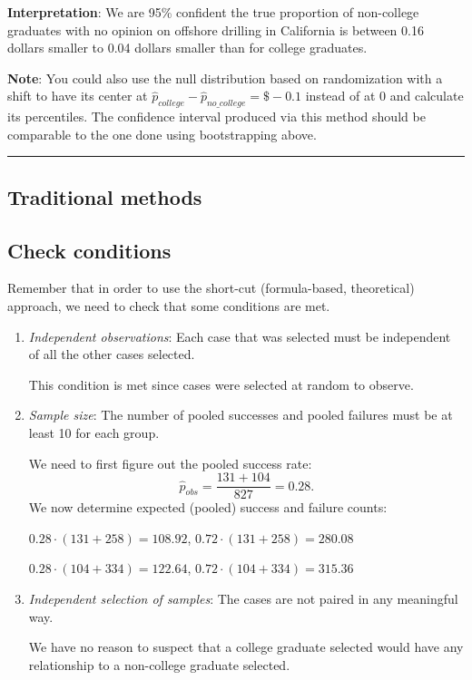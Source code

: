 \documentclass[]{tufte-book}
\let\oldrule=\rule
\renewcommand{\rule}[1]{\oldrule{\linewidth}}
\theoremstyle{definition}
\theoremstyle{definition}
\theoremstyle{remark}
\begin{document}
\textbf{Interpretation}: We are 95\% confident the true proportion of
non-college graduates with no opinion on offshore drilling in California
is between 0.16 dollars smaller to 0.04 dollars smaller than for college
graduates.

\textbf{Note}: You could also use the null distribution based on
randomization with a shift to have its center at
\(\hat{p}_{college} - \hat{p}_{no\_college} = \$-0.1\) instead of at 0
and calculate its percentiles. The confidence interval produced via this
method should be comparable to the one done using bootstrapping above.

\begin{center}\rule{0.5\linewidth}{\linethickness}\end{center}

\subsection{Traditional methods}\label{traditional-methods-2}

\subsection{Check conditions}\label{check-conditions-2}

Remember that in order to use the short-cut (formula-based, theoretical)
approach, we need to check that some conditions are met.

\begin{enumerate}
\def\labelenumi{\arabic{enumi}.}
\item
  \emph{Independent observations}: Each case that was selected must be
  independent of all the other cases selected.

  This condition is met since cases were selected at random to observe.
\item
  \emph{Sample size}: The number of pooled successes and pooled failures
  must be at least 10 for each group.

  We need to first figure out the pooled success rate:
  \[\hat{p}_{obs} = \dfrac{131 + 104}{827} = 0.28.\] We now determine
  expected (pooled) success and failure counts:

  \(0.28 \cdot (131 + 258) = 108.92\),
  \(0.72 \cdot (131 + 258) = 280.08\)

  \(0.28 \cdot (104 + 334) = 122.64\),
  \(0.72 \cdot (104 + 334) = 315.36\)
\item
  \emph{Independent selection of samples}: The cases are not paired in
  any meaningful way.

  We have no reason to suspect that a college graduate selected would
  have any relationship to a non-college graduate selected.
\end{enumerate}
\end{document}
